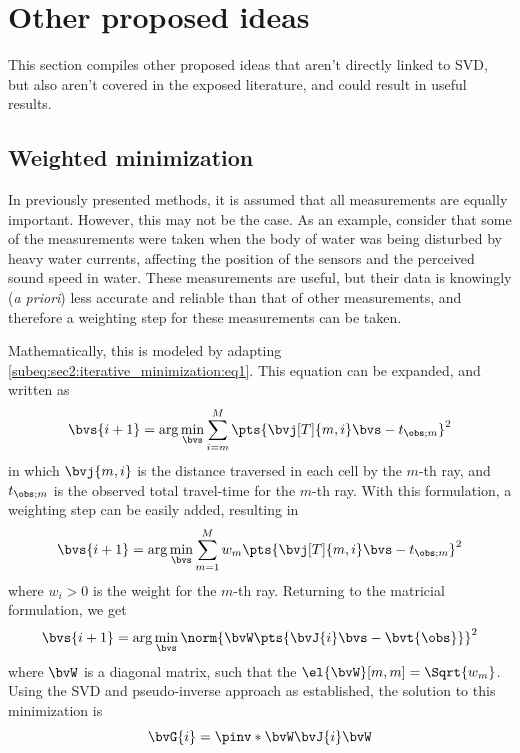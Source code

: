 \section{Other proposed ideas}

This section compiles other proposed ideas that aren't directly linked to SVD, but also aren't covered in the exposed literature, and could result in useful results.

\subsection{Weighted minimization}

In previously presented methods, it is assumed that all measurements are equally important. However, this may not be the case. As an example, consider that some of the measurements were taken when the body of water was being disturbed by heavy water currents, affecting the position of the sensors and the perceived sound speed in water. These measurements are useful, but their data is knowingly (\textit{a priori}) less accurate and reliable than that of other measurements, and therefore a weighting step for these measurements can be taken.

Mathematically, this is modeled by adapting \cref{subeq:sec2:iterative_minimization:eq1}. This equation can be expanded, and written as
\begin{equation}
	\bvs{i+1} = \arg \min_{\bvs} \sum_{i=m}^{M} \pts{\bvj[T]{m,i} \bvs - t_{\obs;m}}^2
\end{equation}
in which $\bvj{m,i}$ is the distance traversed in each cell by the $m$-th ray, and $t_{\obs;m}$ is the observed total travel-time for the $m$-th ray. With this formulation, a weighting step can be easily added, resulting in
\begin{equation}
	\bvs{i+1} = \arg \min_{\bvs} \sum_{m=1}^{M} w_m \pts{\bvj[T]{m,i} \bvs - t_{\obs;m}}^2
\end{equation}
where $w_i > 0$ is the weight for the $m$-th ray. Returning to the matricial formulation, we get
\begin{equation}
	\bvs{i+1} = \arg \min_{\bvs} \norm{\bvW \pts{\bvJ{i} \bvs - \bvt{\obs}}}^2
\end{equation}
where $\bvW$ is a diagonal matrix, such that the $\el{\bvW}[m,m] = \Sqrt{w_m}$. Using the SVD and pseudo-inverse approach as established, the solution to this minimization is
\begin{equation}
	\bvG{i} = \pinv*{\bvW \bvJ{i}} \bvW
	\label{eq:sec3:Gi_weighted_minim}
\end{equation}

